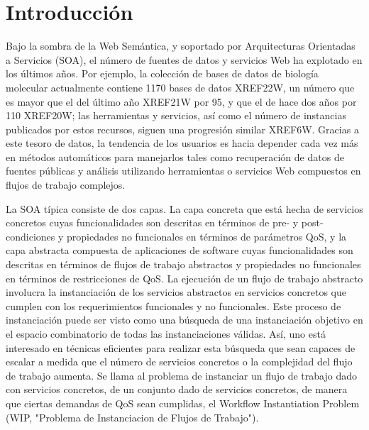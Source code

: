 \documentclass{article}
\begin{document}
\section{Introducción}

Bajo la sombra de la Web Semántica, y soportado por Arquitecturas Orientadas a
Servicios (SOA), el número de fuentes de datos y servicios Web ha explotado en
los últimos años. Por ejemplo, la colección de bases de datos de biología
molecular actualmente contiene 1170 bases de datos XREF22W, un número que es
mayor que el del último año XREF21W por 95, y que el de hace dos años por 110
XREF20W; las herramientas y servicios, así como el número de instancias
publicados por estos recursos, siguen una progresión similar XREF6W. Gracias a
este tesoro de datos, la tendencia de los usuarios es hacia depender cada vez
más en métodos automáticos para manejarlos tales como recuperación de datos de
fuentes públicas y análisis utilizando herramientas o servicios Web compuestos
en flujos de trabajo complejos.

La SOA típica consiste de dos capas. La capa concreta que está hecha de
servicios concretos cuyas funcionalidades son descritas en términos de pre- y
post-condiciones y propiedades no funcionales en términos de parámetros QoS, y
la capa abstracta compuesta de aplicaciones de software cuyas funcionalidades
son descritas en términos de flujos de trabajo abstractos y propiedades no
funcionales en términos de restricciones de QoS. La ejecución de un flujo de
trabajo abstracto involucra la instanciación de los servicios abstractos en
servicios concretos que cumplen con los requerimientos funcionales y no
funcionales. Este proceso de instanciación puede ser visto como una búsqueda de
una instanciación objetivo en el espacio combinatorio de todas las
instanciaciones válidas. Así, uno está interesado en técnicas eficientes para
realizar esta búsqueda que sean capaces de escalar a medida que el número de
servicios concretos o la complejidad del flujo de trabajo aumenta. Se llama al
problema de instanciar un flujo de trabajo dado con servicios concretos, de un
conjunto dado de servicios concretos, de manera que ciertas demandas de QoS sean
cumplidas, el Workflow Instantiation Problem (WIP, "Problema de Instanciacion de
Flujos de Trabajo").
\end{document}

